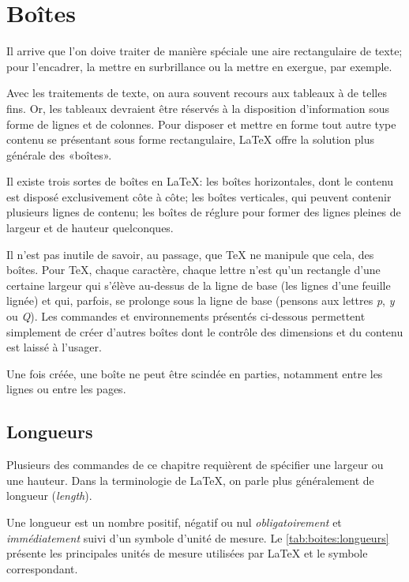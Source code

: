 \chapter{Boîtes}
\label{chap:boites}

Il arrive que l'on doive traiter de manière spéciale une aire
rectangulaire de texte; pour l'encadrer, la mettre en surbrillance ou
la mettre en exergue, par exemple.

Avec les traitements de texte, on aura souvent recours aux tableaux à
de telles fins. Or, les tableaux devraient être réservés à la
disposition d'information sous forme de lignes et de colonnes. Pour
disposer et mettre en forme tout autre type contenu se présentant sous
forme rectangulaire, {\LaTeX} offre la solution plus générale des
«boîtes».

Il existe trois sortes de boîtes en {\LaTeX}: les boîtes horizontales,
dont le contenu est disposé exclusivement côte à côte; les boîtes
verticales, qui peuvent contenir plusieurs lignes de contenu; les
boîtes de réglure pour former des lignes pleines de largeur et de
hauteur quelconques.

Il n'est pas inutile de savoir, au passage, que {\TeX} ne manipule que
cela, des boîtes. Pour {\TeX}, chaque caractère, chaque lettre n'est
qu'un rectangle d'une certaine largeur qui s'élève au-dessus de la
ligne de base (les lignes d'une feuille lignée) et qui, parfois, se
prolonge sous la ligne de base (pensons aux lettres \emph{p}, \emph{y}
ou \emph{Q}). Les commandes et environnements présentés ci-dessous
permettent simplement de créer d'autres boîtes dont le contrôle des
dimensions et du contenu est laissé à l'usager.

Une fois créée, une boîte ne peut être scindée en parties, notamment
entre les lignes ou entre les pages.


\section{Longueurs}
\label{sec:boites:longueurs}

Plusieurs des commandes de ce chapitre requièrent de spécifier une
largeur ou une hauteur. Dans la terminologie de {\LaTeX}, on parle
plus généralement de longueur (\emph{length}).

Une longueur est un nombre positif, négatif ou nul
\emph{obligatoirement} et \emph{immédiatement} suivi d'un symbole
d'unité de mesure. Le \autoref{tab:boites:longueurs} présente les
principales unités de mesure utilisées par {\LaTeX} et le symbole
correspondant.

